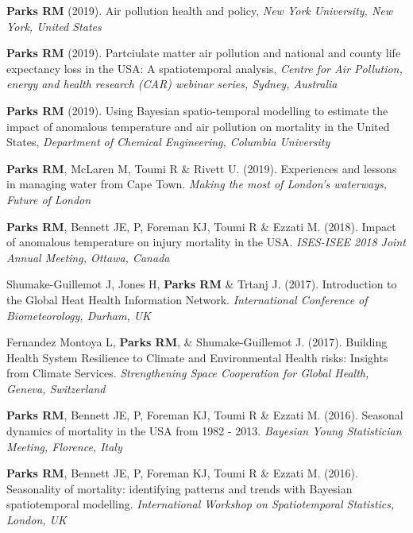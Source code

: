\noindent \textbf{Parks RM} (2019). Air pollution health and policy,  \textit{New York University, New York, United States} \medskip

\noindent \textbf{Parks RM} (2019). Partciulate matter air pollution and national and county life expectancy loss in the USA: A spatiotemporal analysis,  \textit{Centre for Air Pollution, energy and health research (CAR) webinar series, Sydney, Australia} \medskip

\noindent \textbf{Parks RM} (2019). Using Bayesian spatio-temporal modelling to estimate the impact of anomalous temperature and air pollution on mortality in the United States,  \textit{Department of Chemical Engineering, Columbia University} \medskip

\noindent \textbf{Parks RM}, McLaren M, Toumi R \& Rivett U. (2019). Experiences and lessons in managing water from Cape Town. \textit{Making the most of London's waterways, Future of London} \medskip

\noindent \textbf{Parks RM}, Bennett JE, P, Foreman KJ, Toumi R \& Ezzati M. (2018). Impact of anomalous temperature on injury mortality in the USA.  \textit{ISES-ISEE 2018 Joint Annual Meeting, Ottawa, Canada} \medskip

\noindent Shumake-Guillemot J, Jones H, \textbf{Parks RM} \& Trtanj J. (2017). Introduction to the Global Heat Health Information Network.  \textit{International Conference of Biometeorology, Durham, UK} \medskip

\noindent Fernandez Montoya L, \textbf{Parks RM}, \& Shumake-Guillemot J. (2017). Building Health System Resilience to Climate and Environmental Health risks: Insights from Climate Services.  \textit{Strengthening Space Cooperation for Global Health, Geneva, Switzerland} \medskip

\noindent \textbf{Parks RM}, Bennett JE, P, Foreman KJ, Toumi R \& Ezzati M. (2016). Seasonal dynamics of mortality in the USA from 1982 - 2013. \textit{Bayesian Young Statistician Meeting, Florence, Italy} \medskip

\noindent \textbf{Parks RM}, Bennett JE, P, Foreman KJ, Toumi R \& Ezzati M. (2016). Seasonality of mortality: identifying patterns and trends with Bayesian spatiotemporal modelling. \textit{International Workshop on Spatiotemporal Statistics, London, UK}

